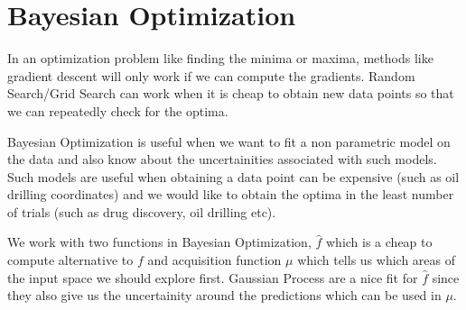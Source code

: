 \documentclass[../../statistical_learning_notes.tex]{subfiles}
\begin{document}
\section{Bayesian Optimization}
In an optimization problem like finding the minima or maxima, methods like gradient descent will only work if we can compute the gradients. Random Search/Grid Search can work when it is cheap to obtain new data points so that we can repeatedly check for the optima.\newline

Bayesian Optimization is useful when we want to fit a non parametric model on the data and also know about the uncertainities associated with such models. Such models are useful when obtaining a data point can be expensive (such as oil drilling coordinates) and we would like to obtain the optima in the least number of trials (such as drug discovery, oil drilling etc).\newline

We work with two functions in Bayesian Optimization, $\hat{f}$ which is a cheap to compute alternative to $f$ and acquisition function $\mu$ which tells us which areas of the input space we should explore first. Gaussian Process are a nice fit for $\hat{f}$ since they also give us the uncertainity around the predictions which can be used in $\mu$.\newline
\end{document}
